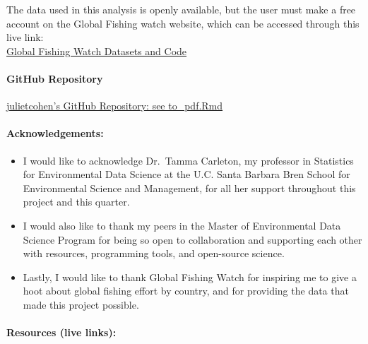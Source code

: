 \documentclass[
]{article}
\providecommand{\tightlist}{%
  \setlength{\itemsep}{0pt}\setlength{\parskip}{0pt}}
\begin{document}
The data used in this analysis is openly available, but the user must
make a free account on the Global Fishing watch website, which can be
accessed through this live link:\\
\href{https://globalfishingwatch.org/data-download/datasets/public-fishing-effort}{Global
Fishing Watch Datasets and Code}\\

\hypertarget{github-repository}{%
\paragraph{GitHub Repository}\label{github-repository}}

\href{https://github.com/julietcohen/fishing_effort}{julietcohen's
GitHub Repository: see to\_pdf.Rmd}

\hypertarget{acknowledgements}{%
\paragraph{Acknowledgements:}\label{acknowledgements}}

\begin{itemize}
\tightlist
\item
  I would like to acknowledge Dr.~Tamma Carleton, my professor in
  Statistics for Environmental Data Science at the U.C. Santa Barbara
  Bren School for Environmental Science and Management, for all her
  support throughout this project and this quarter.\\
\item
  I would also like to thank my peers in the Master of Environmental
  Data Science Program for being so open to collaboration and supporting
  each other with resources, programming tools, and open-source
  science.\\
\item
  Lastly, I would like to thank Global Fishing Watch for inspiring me to
  give a hoot about global fishing effort by country, and for providing
  the data that made this project possible.
\end{itemize}

\hypertarget{resources-live-links}{%
\paragraph{Resources (live links):}\label{resources-live-links}}
\end{document}
